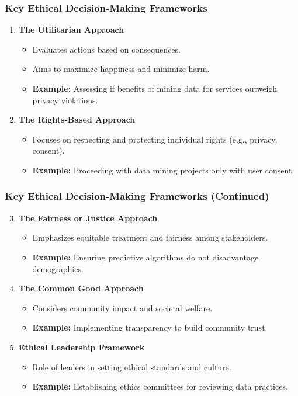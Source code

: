 \documentclass[aspectratio=169]{beamer}
\begin{document}
\begin{frame}[fragile]
    \frametitle{Key Ethical Decision-Making Frameworks}
    \begin{enumerate}
        \item \textbf{The Utilitarian Approach}
        \begin{itemize}
            \item Evaluates actions based on consequences.
            \item Aims to maximize happiness and minimize harm.
            \item \textbf{Example:} Assessing if benefits of mining data for services outweigh privacy violations.
        \end{itemize}

        \item \textbf{The Rights-Based Approach}
        \begin{itemize}
            \item Focuses on respecting and protecting individual rights (e.g., privacy, consent).
            \item \textbf{Example:} Proceeding with data mining projects only with user consent.
        \end{itemize}
    \end{enumerate}
\end{frame}

\begin{frame}[fragile]
    \frametitle{Key Ethical Decision-Making Frameworks (Continued)}
    \begin{enumerate}
        \setcounter{enumi}{2}
        \item \textbf{The Fairness or Justice Approach}
        \begin{itemize}
            \item Emphasizes equitable treatment and fairness among stakeholders.
            \item \textbf{Example:} Ensuring predictive algorithms do not disadvantage demographics.
        \end{itemize}

        \item \textbf{The Common Good Approach}
        \begin{itemize}
            \item Considers community impact and societal welfare.
            \item \textbf{Example:} Implementing transparency to build community trust.
        \end{itemize}

        \item \textbf{Ethical Leadership Framework}
        \begin{itemize}
            \item Role of leaders in setting ethical standards and culture.
            \item \textbf{Example:} Establishing ethics committees for reviewing data practices.
        \end{itemize}
    \end{enumerate}
\end{frame}
\end{document}
